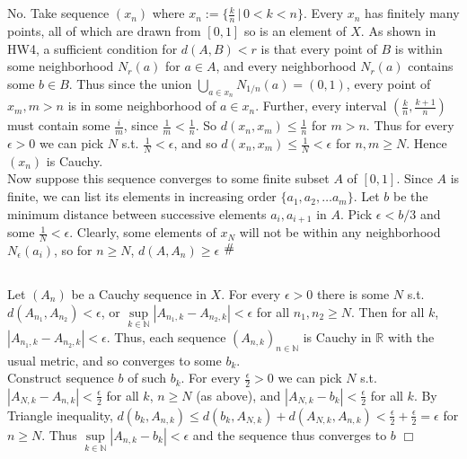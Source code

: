 \documentclass{article}
\newcommand{\contra}{\raisebox{\depth}{\#}}
\begin{document}
\subsection{}
No. Take sequence $(x_n)$ where $x_n := \{\frac{k}{n} \,|\, 0 < k < n\}$. Every $x_n$ has finitely many points, all of which are drawn from $[0,1]$ so is an element of $X$. As shown in HW4, a sufficient condition for $d(A,B) < r$ is that every point of $B$ is within some neighborhood $N_r(a)$ for $a\in A$, and every neighborhood $N_r(a)$ contains some $b\in B$. Thus since the union $\bigcup\limits_{a \in x_n} N_{1/n}(a) = (0,1)$, every point of $x_m,m>n$ is in some neighborhood of $a \in x_n$. Further, every interval $(\frac{k}{n},\frac{k+1}{n})$ must contain some $\frac{i}{m}$, since $\frac{1}{m} < \frac{1}{n}$. So $d(x_n,x_m)\leq\frac{1}{n}$ for $m>n$. Thus for every $\epsilon>0$ we can pick $N$ s.t. $\frac{1}{N} < \epsilon$, and so $d(x_n,x_m) \leq \frac{1}{N} < \epsilon$ for $n,m\geq N$. Hence $(x_n)$ is Cauchy.\\
Now suppose this sequence converges to some finite subset $A$ of $[0,1]$. Since $A$ is finite, we can list its elements in increasing order $\{a_1,a_2,\dots a_m\}$. Let $b$ be the minimum distance between successive elements $a_i,a_{i+1}$ in $A$. Pick $\epsilon < b/3$ and some $\frac{1}{N} < \epsilon$. Clearly, some elements of $x_N$ will not be within any neighborhood $N_\epsilon(a_i)$, so for $n\geq N$, $d(A,A_n) \geq \epsilon$ $\contra$

\subsection{}
Let $(A_n)$ be a Cauchy sequence in $X$. For every $\epsilon > 0$ there is some $N$ s.t. $d(A_{n_1},A_{n_2}) < \epsilon$, or $\sup\limits_{k\in\mathbb{N}} |A_{n_1,k}-A_{n_2,k}| < \epsilon$ for all $n_1,n_2 \geq N$. Then for all $k$, $|A_{n_1,k}-A_{n_2,k}| < \epsilon$. Thus, each sequence $(A_{n,k})_{n\in\mathbb{N}}$ is Cauchy in $\mathbb{R}$ with the usual metric, and so converges to some $b_k$.\\
Construct sequence $b$ of such $b_k$. For every $\frac{\epsilon}{2} > 0$ we can pick $N$ s.t. $|A_{N,k}-A_{n,k}| < \frac{\epsilon}{2}$ for all $k$, $n\geq N$ (as above), and $|A_{N,k} - b_k| < \frac{\epsilon}{2}$ for all $k$. By Triangle inequality, $d(b_k,A_{n,k}) \leq d(b_k,A_{N,k}) + d(A_{N,k},A_{n,k}) < \frac{\epsilon}{2} + \frac{\epsilon}{2} = \epsilon$ for $n\geq N$. Thus $\sup\limits_{k\in\mathbb{N}}|A_{n,k} - b_k| < \epsilon$ and the sequence thus converges to $b$ $\Box$
\end{document}
